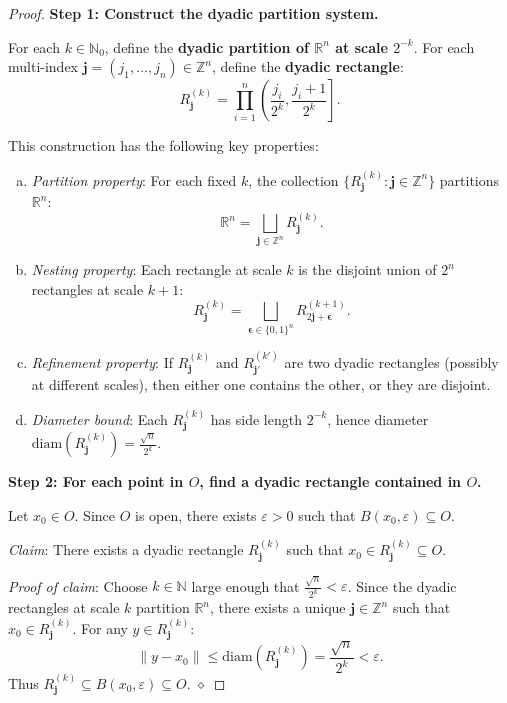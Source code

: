 \documentclass[11pt]{report}
\begin{document}
\begin{proof}
\textbf{Step 1: Construct the dyadic partition system.}

For each $k \in \mathbb{N}_0$, define the \textbf{dyadic partition of $\mathbb{R}^n$ at scale $2^{-k}$}. For each multi-index $\mathbf{j} = (j_1, \ldots, j_n) \in \mathbb{Z}^n$, define the \textbf{dyadic rectangle}:
\[
R_{\mathbf{j}}^{(k)} = \prod_{i=1}^{n} \left( \frac{j_i}{2^k}, \frac{j_i + 1}{2^k} \right].
\]

This construction has the following key properties:
\begin{enumerate}[(a)]
    \item \textit{Partition property}: For each fixed $k$, the collection $\{R_{\mathbf{j}}^{(k)} : \mathbf{j} \in \mathbb{Z}^n\}$ partitions $\mathbb{R}^n$:
    \[
    \mathbb{R}^n = \bigsqcup_{\mathbf{j} \in \mathbb{Z}^n} R_{\mathbf{j}}^{(k)}.
    \]
    \item \textit{Nesting property}: Each rectangle at scale $k$ is the disjoint union of $2^n$ rectangles at scale $k+1$:
    \[
    R_{\mathbf{j}}^{(k)} = \bigsqcup_{\boldsymbol{\epsilon} \in \{0,1\}^n} R_{2\mathbf{j} + \boldsymbol{\epsilon}}^{(k+1)}.
    \]
    \item \textit{Refinement property}: If $R_{\mathbf{j}}^{(k)}$ and $R_{\mathbf{j}'}^{(k')}$ are two dyadic rectangles (possibly at different scales), then either one contains the other, or they are disjoint.
    \item \textit{Diameter bound}: Each $R_{\mathbf{j}}^{(k)}$ has side length $2^{-k}$, hence diameter $\mathrm{diam}(R_{\mathbf{j}}^{(k)}) = \frac{\sqrt{n}}{2^k}$.
\end{enumerate}

\textbf{Step 2: For each point in $O$, find a dyadic rectangle contained in $O$.}

Let $x_0 \in O$. Since $O$ is open, there exists $\varepsilon > 0$ such that $B(x_0, \varepsilon) \subseteq O$.

\textit{Claim}: There exists a dyadic rectangle $R_{\mathbf{j}}^{(k)}$ such that $x_0 \in R_{\mathbf{j}}^{(k)} \subseteq O$.

\textit{Proof of claim}: Choose $k \in \mathbb{N}$ large enough that $\frac{\sqrt{n}}{2^k} < \varepsilon$. Since the dyadic rectangles at scale $k$ partition $\mathbb{R}^n$, there exists a unique $\mathbf{j} \in \mathbb{Z}^n$ such that $x_0 \in R_{\mathbf{j}}^{(k)}$. For any $y \in R_{\mathbf{j}}^{(k)}$:
\[
\|y - x_0\| \leq \mathrm{diam}(R_{\mathbf{j}}^{(k)}) = \frac{\sqrt{n}}{2^k} < \varepsilon.
\]
Thus $R_{\mathbf{j}}^{(k)} \subseteq B(x_0, \varepsilon) \subseteq O$. \hfill $\diamond$


\end{proof}
\end{document}
